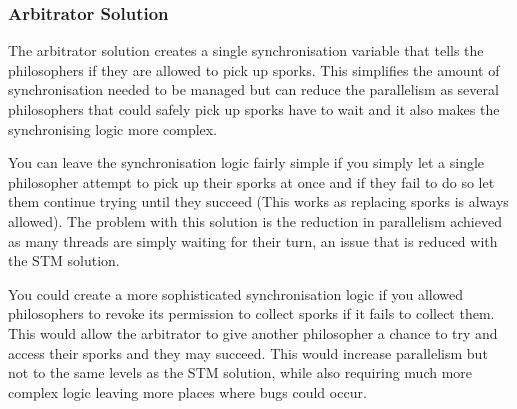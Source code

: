 \documentclass[a4paper]{article}
\begin{document}
\subsubsection{Arbitrator Solution}
The arbitrator solution creates a single synchronisation variable that tells the philosophers if they are allowed to pick up sporks.
This simplifies the amount of synchronisation needed to be managed but can reduce the parallelism as several philosophers that could safely pick up sporks have to wait and it also makes the synchronising logic more complex.
\par
You can leave the synchronisation logic fairly simple if you simply let a single philosopher attempt to pick up their sporks at once and if they fail to do so let them continue trying until they succeed (This works as replacing sporks is always allowed).
The problem with this solution is the reduction in parallelism achieved as many threads are simply waiting for their turn, an issue that is reduced with the STM solution.
\par
You could create a more sophisticated synchronisation logic if you allowed philosophers to revoke its permission to collect sporks if it fails to collect them.
This would allow the arbitrator to give another philosopher a chance to try and access their sporks and they may succeed.
This would increase parallelism but not to the same levels as the STM solution, while also requiring much more complex logic leaving more places where bugs could occur.
\end{document}
